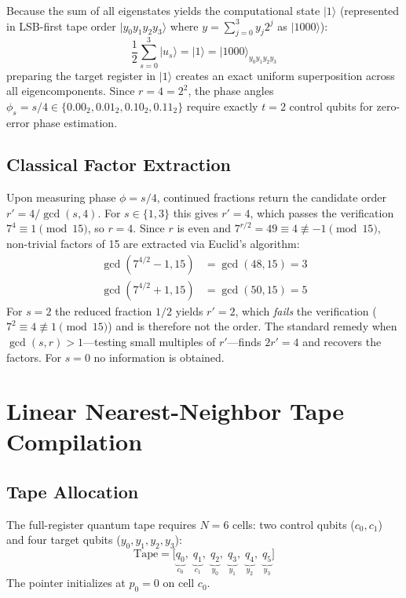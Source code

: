 \documentclass[11pt,a4paper,twocolumn]{article}
\newcommand{\ket}[1]{| #1 \rangle}
\begin{document}
Because the sum of all eigenstates yields the computational state $\ket{1}$ (represented in LSB-first tape order $\ket{y_0 y_1 y_2 y_3}$ where $y = \sum_{j=0}^3 y_j 2^j$ as $\ket{1000}$):
\begin{equation}
    \frac{1}{2}\sum_{s=0}^3 \ket{u_s} = \ket{1} = \ket{1000}_{y_0 y_1 y_2 y_3}
\end{equation}
preparing the target register in $\ket{1}$ creates an exact uniform superposition across all eigencomponents. Since $r = 4 = 2^2$, the phase angles $\phi_s = s/4 \in \{0.00_2, 0.01_2, 0.10_2, 0.11_2\}$ require exactly $t = 2$ control qubits for zero-error phase estimation.

\subsection{Classical Factor Extraction}
Upon measuring phase $\phi = s/4$, continued fractions return the candidate order $r' = 4/\gcd(s, 4)$. For $s \in \{1, 3\}$ this gives $r' = 4$, which passes the verification $7^4 \equiv 1 \pmod{15}$, so $r = 4$. Since $r$ is even and $7^{r/2} = 49 \equiv 4 \not\equiv -1 \pmod{15}$, non-trivial factors of 15 are extracted via Euclid's algorithm:
\begin{align}
    \gcd(7^{4/2} - 1, 15) &= \gcd(48, 15) = 3 \\
    \gcd(7^{4/2} + 1, 15) &= \gcd(50, 15) = 5
\end{align}
For $s = 2$ the reduced fraction $1/2$ yields $r' = 2$, which \emph{fails} the verification ($7^2 \equiv 4 \not\equiv 1 \pmod{15}$) and is therefore not the order. The standard remedy when $\gcd(s, r) > 1$---testing small multiples of $r'$---finds $2r' = 4$ and recovers the factors. For $s = 0$ no information is obtained.

\section{Linear Nearest-Neighbor Tape Compilation}

\subsection{Tape Allocation}
The full-register quantum tape requires $N = 6$ cells: two control qubits ($c_0, c_1$) and four target qubits ($y_0, y_1, y_2, y_3$):
\begin{equation}
    \text{Tape} = \Big[ \underbrace{q_0}_{c_0}, \; \underbrace{q_1}_{c_1}, \; \underbrace{q_2}_{y_0}, \; \underbrace{q_3}_{y_1}, \; \underbrace{q_4}_{y_2}, \; \underbrace{q_5}_{y_3} \Big]
\end{equation}
The pointer initializes at $p_0 = 0$ on cell $c_0$.
\end{document}
